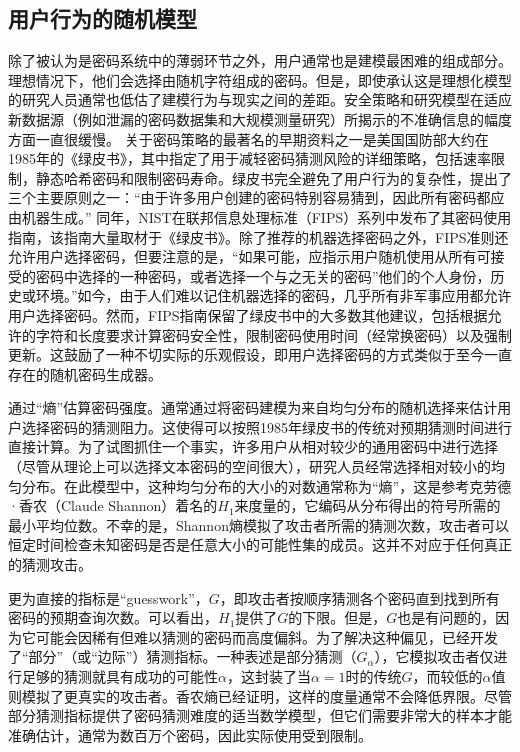 \subsection{用户行为的随机模型}

除了被认为是密码系统中的薄弱环节之外，用户通常也是建模最困难的组成部分。理想情况下，他们会选择由随机字符组成的密码。但是，即使承认这是理想化模型的研究人员通常也低估了建模行为与现实之间的差距。安全策略和研究模型在适应新数据源（例如泄漏的密码数据集和大规模测量研究）所揭示的不准确信息的幅度方面一直很缓慢。
关于密码策略的最著名的早期资料之一是美国国防部大约在1985年的《绿皮书》，其中指定了用于减轻密码猜测风险的详细策略，包括速率限制，静态哈希密码和限制密码寿命。绿皮书完全避免了用户行为的复杂性，提出了三个主要原则之一：“由于许多用户创建的密码特别容易猜到，因此所有密码都应由机器生成。”
同年，NIST在联邦信息处理标准（FIPS）系列中发布了其密码使用指南，该指南大量取材于《绿皮书》。除了推荐的机器选择密码之外，FIPS准则还允许用户选择密码，但要注意的是，“如果可能，应指示用户随机使用从所有可接受的密码中选择的一种密码，或者选择一个与之无关的密码”他们的个人身份，历史或环境。”如今，由于人们难以记住机器选择的密码，几乎所有非军事应用都允许用户选择密码。然而，FIPS指南保留了绿皮书中的大多数其他建议，包括根据允许的字符和长度要求计算密码安全性，限制密码使用时间（经常换密码）以及强制更新。这鼓励了一种不切实际的乐观假设，即用户选择密码的方式类似于至今一直存在的随机密码生成器。

通过“熵”估算密码强度。通常通过将密码建模为来自均匀分布的随机选择来估计用户选择密码的猜测阻力。这使得可以按照1985年绿皮书的传统对预期猜测时间进行直接计算。为了试图抓住一个事实，许多用户从相对较少的通用密码中进行选择（尽管从理论上可以选择文本密码的空间很大），研究人员经常选择相对较小的均匀分布。在此模型中，这种均匀分布的大小的对数通常称为“熵”，这是参考克劳德·香农（Claude Shannon）着名的$H_1$来度量的，它编码从分布得出的符号所需的最小平均位数。不幸的是，Shannon熵模拟了攻击者所需的猜测次数，攻击者可以恒定时间检查未知密码是否是任意大小的可能性集的成员。这并不对应于任何真正的猜测攻击。

更为直接的指标是“guesswork”，$G$，即攻击者按顺序猜测各个密码直到找到所有密码的预期查询次数。可以看出，$H_1$提供了$G$的下限。但是，$G$也是有问题的，因为它可能会因稀有但难以猜测的密码而高度偏斜。为了解决这种偏见，已经开发了“部分”（或“边际”）猜测指标。一种表述是部分猜测（$G_{\alpha}$），它模拟攻击者仅进行足够的猜测就具有成功的可能性$\alpha$，这封装了当$\alpha= 1$时的传统$G$，而较低的$\alpha$值则模拟了更真实的攻击者。香农熵已经证明，这样的度量通常不会降低界限。尽管部分猜测指标提供了密码猜测难度的适当数学模型，但它们需要非常大的样本才能准确估计，通常为数百万个密码，因此实际使用受到限制。

